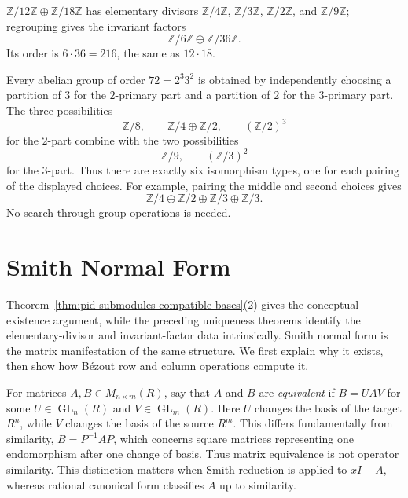 \begin{example}
\(\mathbb Z/12\mathbb Z\oplus\mathbb Z/18\mathbb Z\) has
elementary divisors \(\mathbb Z/4\mathbb Z\), \(\mathbb Z/3\mathbb Z\),
\(\mathbb Z/2\mathbb Z\), and \(\mathbb Z/9\mathbb Z\); regrouping gives
the invariant factors
\[
\mathbb Z/6\mathbb Z\oplus\mathbb Z/36\mathbb Z.
\]
Its order is \(6\cdot36=216\), the same as \(12\cdot18\).
\end{example}

\begin{example}
Every abelian group of order \(72=2^3 3^2\) is obtained by independently
choosing a partition of \(3\) for the \(2\)-primary part and a partition of
\(2\) for the \(3\)-primary part.  The three possibilities
\[
\mathbb Z/8,\qquad \mathbb Z/4\oplus\mathbb Z/2,\qquad
(\mathbb Z/2)^3
\]
for the \(2\)-part combine with the two possibilities
\[
\mathbb Z/9,\qquad(\mathbb Z/3)^2
\]
for the \(3\)-part.  Thus there are exactly six isomorphism types, one for
each pairing of the displayed choices.  For example, pairing the middle and
second choices gives
\[
\mathbb Z/4\oplus\mathbb Z/2\oplus
\mathbb Z/3\oplus\mathbb Z/3.
\]
No search through group operations is needed.
\end{example}

\section{Smith Normal Form}
Theorem~\ref{thm:pid-submodules-compatible-bases}(2) gives the conceptual
existence argument, while the preceding uniqueness theorems identify the
elementary-divisor and invariant-factor data intrinsically. Smith normal form
is the matrix manifestation of the same structure. We first explain why it exists, then
show how B\'ezout row and column operations compute it.

For matrices \(A,B\in M_{n\times m}(R)\), say that \(A\) and \(B\) are
\emph{equivalent} if \(B=UAV\) for some
\(U\in\operatorname{GL}_n(R)\) and \(V\in\operatorname{GL}_m(R)\).
Here \(U\) changes the basis of the target \(R^n\), while \(V\) changes the
basis of the source \(R^m\). This differs fundamentally from similarity,
\(B=P^{-1}AP\), which concerns square matrices representing one endomorphism
after one change of basis. Thus matrix equivalence is not operator similarity.
This distinction matters when Smith reduction is applied to \(xI-A\), whereas
rational canonical form classifies \(A\) up to similarity.

